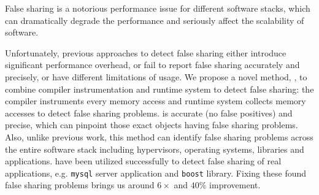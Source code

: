 
\begin{comment}
False sharing is notorious for performance degradation in multithreaded
programs. It apprears when two or more threads running on different cores periodically access 
different portions of data that can fit into one cache line. Since caching
system in a multicore processor needs to ensure a coherent view of memory
accross all cores, it has to grant an exclusive access
for each write operation by invidating duplicate copies in other cores. As a
result, frequent cache invalidation can seriously affect the scalability and
performance of multithreaded programs.
\end{comment} 

False sharing is a notorious performance issue for different software stacks, 
which can dramatically degrade the performance and seriously affect the scalability 
of software.

Unfortunately, previous approaches to detect false sharing
either introduce significant performance overhead, or fail
to report false sharing accurately and precisely, or have different limitations of usage. 
We propose a novel method, , to combine compiler instrumentation
and runtime system to detect false sharing: 
the compiler instruments every memory access and 
runtime system collects memory accesses to detect false sharing problems.
 is accurate (no false positives) and precise, which can pinpoint 
those exact objects having false sharing problems.
Also, unlike previous work, this method can
identify false sharing problems across the entire software stack including 
hypervisors, operating systems, libraries and applications. 
 have been utilized successfully to detect false sharing of real applications,
e.g. \texttt{mysql} server application and \texttt{boost} library. Fixing these found
false sharing problems brings us around $6\times$ and $40\%$ improvement.

